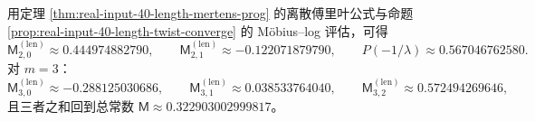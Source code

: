 \begin{remark}[可审计数值锚点：\texorpdfstring{$m=2,3$}{m=2,3} 的长度同余常数]\label{rem:real-input-40-length-mertens-numeric}
用定理 \ref{thm:real-input-40-length-mertens-prog} 的离散傅里叶公式与命题 \ref{prop:real-input-40-length-twist-converge} 的 Möbius--log 评估，可得
\[
\mathsf{M}^{(\mathrm{len})}_{2,0}\approx 0.444974882790,\qquad
\mathsf{M}^{(\mathrm{len})}_{2,1}\approx -0.122071879790,
\qquad
P(-1/\lambda)\approx 0.567046762580.
\]
对 \(m=3\)：
\[
\mathsf{M}^{(\mathrm{len})}_{3,0}\approx -0.288125030686,\qquad
\mathsf{M}^{(\mathrm{len})}_{3,1}\approx 0.038533764040,\qquad
\mathsf{M}^{(\mathrm{len})}_{3,2}\approx 0.572494269646,
\]
且三者之和回到总常数 \(\mathsf{M}\approx 0.322903002999817\)。
\end{remark}

